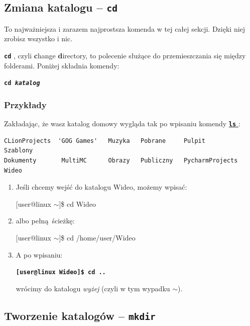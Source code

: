 \documentclass[12pt]{article}
\makeatletter
\newcommand{\ttbf}[1]{
    \texttt{\textbf{#1}}
}
\newenvironment{console1}
{
    \ttfamily
    \fontseries{b}
    \selectfont
    {[}user@linux $\sim${]}\$} {

}
\makeatother
\begin{document}
\subsection{Zmiana katalogu -- \ttbf{cd}}
\label{sec:cd}

To najważniejsza i zarazem najprostsza komenda w tej całej sekcji. Dzięki niej zrobisz wszystko i nic.

\ttbf{cd}, czyli \textbf{c}hange \textbf{d}irectory, to polecenie służące do przemieszczania się między folderami. Poniżej składnia komendy:

\ttbf{cd \emph{katalog}}

\subsubsection{Przykłady}

Zakładając, że wasz katalog domowy wygląda tak po wpisaniu komendy \hyperref[sec:ls]{\ttbf{ls}}:

\begin{verbatim}
CLionProjects  'GOG Games'   Muzyka   Pobrane     Pulpit            Szablony
Dokumenty       MultiMC      Obrazy   Publiczny   PycharmProjects   Wideo
\end{verbatim}

\begin{enumerate}
    \item Jeśli chcemy wejść do katalogu Wideo, możemy wpisać:

    \begin{console1}
        cd Wideo
    \end{console1}

    \item albo pełną ścieżkę:

    \begin{console1}
        cd /home/user/Wideo
    \end{console1}

    \item A po wpisaniu:

    \ttbf{[user@linux Wideo]\$ cd ..}
    
    wrócimy do katalogu \emph{wyżej} (czyli w tym wypadku $\sim$).
\end{enumerate}

\subsection{Tworzenie katalogów -- \ttbf{mkdir}}
\end{document}
